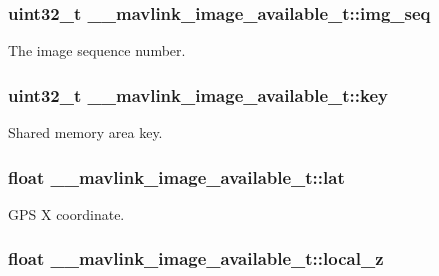 \hypertarget{struct____mavlink__image__available__t_a8574894f5f5fd321cea7c83ef6756873}{
\subsubsection[{img\+\_\+seq}]{\setlength{\rightskip}{0pt plus 5cm}uint32\+\_\+t \+\_\+\+\_\+mavlink\+\_\+image\+\_\+available\+\_\+t\+::img\+\_\+seq}}\label{struct____mavlink__image__available__t_a8574894f5f5fd321cea7c83ef6756873}


The image sequence number. 

\hypertarget{struct____mavlink__image__available__t_a042a2b1564807927e9b174ceed464535}{
\subsubsection[{key}]{\setlength{\rightskip}{0pt plus 5cm}uint32\+\_\+t \+\_\+\+\_\+mavlink\+\_\+image\+\_\+available\+\_\+t\+::key}}\label{struct____mavlink__image__available__t_a042a2b1564807927e9b174ceed464535}


Shared memory area key. 

\hypertarget{struct____mavlink__image__available__t_a9325fb7fc6a336498abdd3deefc6ae32}{
\subsubsection[{lat}]{\setlength{\rightskip}{0pt plus 5cm}float \+\_\+\+\_\+mavlink\+\_\+image\+\_\+available\+\_\+t\+::lat}}\label{struct____mavlink__image__available__t_a9325fb7fc6a336498abdd3deefc6ae32}


G\+P\+S X coordinate. 

\hypertarget{struct____mavlink__image__available__t_af5b42ebab80cce99211e957e4cb4aab1}{
\subsubsection[{local\+\_\+z}]{\setlength{\rightskip}{0pt plus 5cm}float \+\_\+\+\_\+mavlink\+\_\+image\+\_\+available\+\_\+t\+::local\+\_\+z}}\label{struct____mavlink__image__available__t_af5b42ebab80cce99211e957e4cb4aab1}


